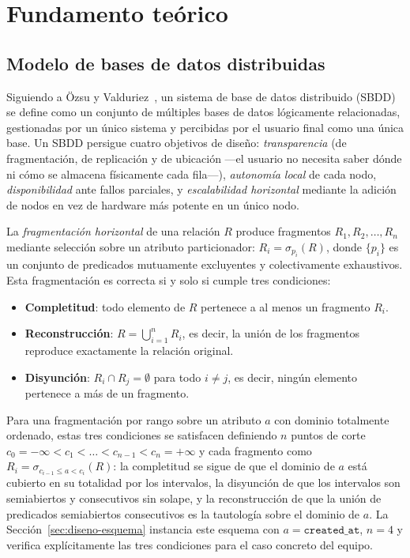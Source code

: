 \section{Fundamento teórico}
\label{sec:fundamento-teorico}

\subsection{Modelo de bases de datos distribuidas}

Siguiendo a Özsu y Valduriez~\cite{ozsu2011principles}, un sistema de base de datos distribuido
(SBDD) se define como un conjunto de múltiples bases de datos lógicamente relacionadas,
gestionadas por un único sistema y percibidas por el usuario final como una única base. Un SBDD
persigue cuatro objetivos de diseño: \emph{transparencia} (de fragmentación, de replicación y de
ubicación —el usuario no necesita saber dónde ni cómo se almacena físicamente cada fila—),
\emph{autonomía local} de cada nodo, \emph{disponibilidad} ante fallos parciales, y
\emph{escalabilidad horizontal} mediante la adición de nodos en vez de hardware más potente en un
único nodo.

La \emph{fragmentación horizontal} de una relación $R$ produce fragmentos $R_1, R_2, \dots, R_n$
mediante selección sobre un atributo particionador: $R_i = \sigma_{p_i}(R)$, donde $\{p_i\}$ es un
conjunto de predicados mutuamente excluyentes y colectivamente exhaustivos. Esta fragmentación es
correcta si y solo si cumple tres condiciones:

\begin{itemize}[leftmargin=1.5em]
    \item \textbf{Completitud}: todo elemento de $R$ pertenece a al menos un fragmento $R_i$.
    \item \textbf{Reconstrucción}: $R = \bigcup_{i=1}^{n} R_i$, es decir, la unión de los
        fragmentos reproduce exactamente la relación original.
    \item \textbf{Disyunción}: $R_i \cap R_j = \emptyset$ para todo $i \neq j$, es decir, ningún
        elemento pertenece a más de un fragmento.
\end{itemize}

Para una fragmentación por rango sobre un atributo $a$ con dominio totalmente ordenado, estas tres
condiciones se satisfacen definiendo $n$ puntos de corte $c_0 = -\infty < c_1 < \dots < c_{n-1} <
c_n = +\infty$ y cada fragmento como $R_i = \sigma_{c_{i-1} \leq a < c_i}(R)$: la completitud se
sigue de que el dominio de $a$ está cubierto en su totalidad por los intervalos, la disyunción de
que los intervalos son semiabiertos y consecutivos sin solape, y la reconstrucción de que la unión
de predicados semiabiertos consecutivos es la tautología sobre el dominio de $a$. La
Sección~\ref{sec:diseno-esquema} instancia este esquema con $a = \texttt{created\_at}$, $n = 4$ y
verifica explícitamente las tres condiciones para el caso concreto del equipo.

